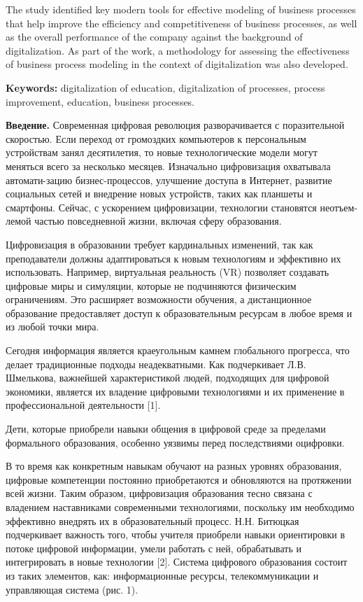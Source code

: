 The study identified key modern tools for effective modeling of business
processes that help improve the efficiency and competitiveness of
business processes, as well as the overall performance of the company
against the background of digitalization. As part of the work, a
methodology for assessing the effectiveness of business process modeling
in the context of digitalization was also developed.

{\bfseries Keywords:} digitalization of education, digitalization of
processes, process improvement, education, business processes.
\begin{multicols}{2}

{\bfseries Введение.} Современная цифровая революция разворачивается с
поразительной скоростью. Если переход от громоздких компьютеров к
персональным устройствам занял десятилетия, то новые технологические
модели могут меняться всего за несколько месяцев. Изначально
цифровизация охватывала автомати-зацию бизнес-процессов, улучшение
доступа в Интернет, развитие социальных сетей и внедрение новых
устройств, таких как планшеты и смартфоны. Сейчас, с ускорением
цифровизации, технологии становятся неотъем-лемой частью повседневной
жизни, включая сферу образования.

Цифровизация в образовании требует кардинальных изменений, так как
преподаватели должны адаптироваться к новым технологиям и эффективно их
использовать. Например, виртуальная реальность (VR) позволяет создавать
цифровые миры и симуляции, которые не подчиняются физическим
ограничениям. Это расширяет возможности обучения, а дистанционное
образование предоставляет доступ к образовательным ресурсам в любое
время и из любой точки мира.

Сегодня информация является краеугольным камнем глобального прогресса,
что делает традиционные подходы неадекватными. Как подчеркивает Л.В.
Шмелькова, важнейшей характеристикой людей, подходящих для цифровой
экономики, является их владение цифровыми технологиями и их применение в
профессиональной деятельности {[}1{]}.

Дети, которые приобрели навыки общения в цифровой среде за пределами
формального образования, особенно уязвимы перед последствиями оцифровки.

В то время как конкретным навыкам обучают на разных уровнях образования,
цифровые компетенции постоянно приобретаются и обновляются на протяжении
всей жизни. Таким образом, цифровизация образования тесно связана с
владением наставниками современными технологиями, поскольку им
необходимо эффективно внедрять их в образовательный процесс. Н.Н.
Битюцкая подчеркивает важность того, чтобы учителя приобрели навыки
ориентировки в потоке цифровой информации, умели работать с ней,
обрабатывать и интегрировать в новые технологии {[}2{]}. Система
цифрового образования состоит из таких элементов, как: информационные
ресурсы, телекоммуникации и управляющая система (рис. 1).
\end{multicols}

